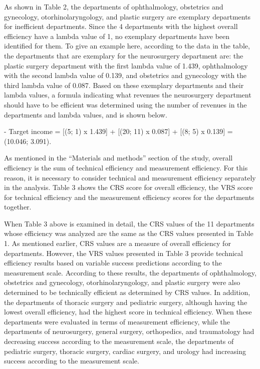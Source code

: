 \begin{multicols}{2}
As shown in Table 2, the departments of ophthalmology, obstetrics and
gynecology, otorhinolaryngology, and plastic surgery are exemplary
departments for inefficient departments. Since the 4 departments with
the highest overall efficiency have a lambda value of 1, no exemplary
departments have been identified for them. To give an example here,
according to the data in the table, the departments that are exemplary
for the neurosurgery department are: the plastic surgery department with
the first lambda value of 1.439, ophthalmology with the second lambda
value of 0.139, and obstetrics and gynecology with the third lambda
value of 0.087. Based on these exemplary departments and their lambda
values, a formula indicating what revenues the neurosurgery department
should have to be efficient was determined using the number of revenues
in the departments and lambda values, and is shown below.

- Target income = {[}(5; 1) x 1.439{]} + {[}(20; 11) x 0.087{]} + {[}(8;
5) x 0.139{]} = (10.046; 3.091).

As mentioned in the ``Materials and methods'' section of the study,
overall efficiency is the sum of technical efficiency and measurement
efficiency. For this reason, it is necessary to consider technical and
measurement efficiency separately in the analysis. Table 3 shows the CRS
score for overall efficiency, the VRS score for technical efficiency and
the measurement efficiency scores for the departments together.

When Table 3 above is examined in detail, the CRS values
\hspace{0pt}\hspace{0pt}of the 11 departments whose efficiency was
analyzed are the same as the CRS values
\hspace{0pt}\hspace{0pt}presented in Table 1. As mentioned earlier, CRS
values \hspace{0pt}\hspace{0pt}are a measure of overall efficiency for
departments. However, the VRS values \hspace{0pt}\hspace{0pt}presented
in Table 3 provide technical efficiency results based on variable
success predictions according to the measurement scale. According to
these results, the departments of ophthalmology, obstetrics and
gynecology, otorhinolaryngology, and plastic surgery were also
determined to be technically efficient as determined by CRS values. In
addition, the departments of thoracic surgery and pediatric surgery,
although having the lowest overall efficiency, had the highest score in
technical efficiency. When these departments were evaluated in terms of
measurement efficiency, while the departments of neurosurgery, general
surgery, orthopedics, and traumatology had decreasing success according
to the measurement scale, the departments of pediatric surgery, thoracic
surgery, cardiac surgery, and urology had increasing success according
to the measurement scale.
\end{multicols}

